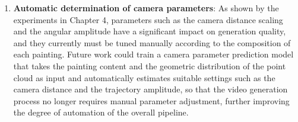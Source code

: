 \begin{enumerate}
  \item \textbf{Automatic determination of camera parameters}:
        As shown by the experiments in Chapter 4, parameters such as the camera distance scaling and the angular amplitude have a significant impact on generation quality,
        and they currently must be tuned manually according to the composition of each painting.
        Future work could train a camera parameter prediction model
        that takes the painting content and the geometric distribution of the point cloud as input
        and automatically estimates suitable settings such as the camera distance and the trajectory amplitude,
        so that the video generation process no longer requires manual parameter adjustment,
        further improving the degree of automation of the overall pipeline.

\end{enumerate}
